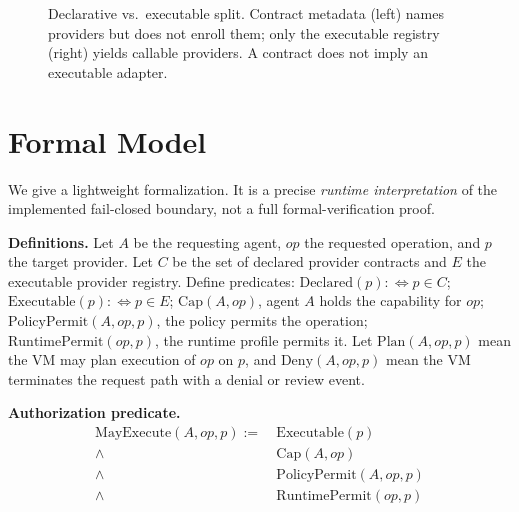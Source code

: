 \documentclass[conference]{IEEEtran}
\newcommand{\code}[1]{\texttt{\small #1}}
\begin{document}
\begin{figure}[t]
\centering
{}
\caption{Declarative vs.\ executable split. Contract metadata (left) names providers but
does not enroll them; only the executable registry (right) yields callable providers. A
contract does not imply an executable adapter.}
\label{fig:split}
\end{figure}

\section{Formal Model}\label{sec:formal}
We give a lightweight formalization. It is a precise \emph{runtime interpretation} of the
implemented fail-closed boundary, not a full formal-verification proof.

\noindent\textbf{Definitions.} Let $A$ be the requesting agent, $op$ the requested
operation, and $p$ the target provider. Let $C$ be the set of declared provider contracts
and $E$ the executable provider registry. Define predicates: $\mathrm{Declared}(p)
:\Leftrightarrow p\in C$; $\mathrm{Executable}(p):\Leftrightarrow p\in E$;
$\mathrm{Cap}(A,op)$, agent $A$ holds the capability for $op$; $\mathrm{PolicyPermit}(A,op,p)$,
the policy permits the operation; $\mathrm{RuntimePermit}(op,p)$, the runtime profile permits
it. Let $\mathrm{Plan}(A,op,p)$ mean the VM may plan execution of $op$ on $p$, and
$\mathrm{Deny}(A,op,p)$ mean the VM terminates the request path with a denial or review
event.

\noindent\textbf{Authorization predicate.}
\begin{align*}
\mathrm{MayExecute}(A,op,p) :=\ &
\mathrm{Executable}(p) \\
\wedge\ & \mathrm{Cap}(A,op) \\
\wedge\ & \mathrm{PolicyPermit}(A,op,p) \\
\wedge\ & \mathrm{RuntimePermit}(op,p)
\end{align*}
\end{document}
